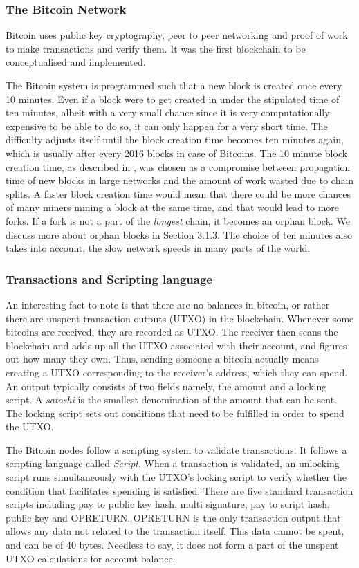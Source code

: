 \documentclass[english]{tktltiki}
\begin{document}
\subsubsection{The Bitcoin Network}

Bitcoin uses public key cryptography, peer to peer networking and proof of work to make transactions and verify them. It was the first blockchain to be conceptualised and implemented.

The Bitcoin system is programmed such that a new block is created once every 10 minutes. Even if a block were to get created in under the stipulated time of ten minutes, albeit with a very small chance since it is very computationally expensive to be able to do so, it can only  happen for a very short time. The difficulty adjusts itself until the block creation time becomes ten minutes again, which is usually after every 2016 blocks in case of Bitcoins. The 10 minute block creation time, as described in \cite{bitcoin}, was chosen as a compromise between propagation time of new blocks in large networks and the amount of work wasted due to chain splits. A faster block creation time would mean that there could be more chances of many miners mining a block at the same time, and that would lead to more forks. If a fork is not a part of the \textit{longest} chain, it becomes an orphan block. We discuss more about orphan blocks in Section 3.1.3. The choice of ten minutes also takes into account, the slow network speeds in many parts of the world.

\subsubsection{Transactions and Scripting language}

An interesting fact to note is that there are no balances in bitcoin, or rather there are unspent transaction outputs (UTXO) in the blockchain. Whenever some bitcoins are received, they are recorded as UTXO. The receiver then scans the blockchain and adds up all the UTXO associated with their account, and figures out how many they own. Thus, sending someone a bitcoin actually means creating a UTXO corresponding to the receiver's address, which they can spend. An output typically consists of two fields namely, the amount and a locking script. A \textit{satoshi} is the smallest denomination of the amount that can be sent. The locking script sets out conditions that need to be fulfilled in order to spend the UTXO.

The Bitcoin nodes follow a scripting system to validate transactions. It follows a scripting language called \textit{Script}. When a transaction is validated, an unlocking script runs simultaneously with the UTXO's locking script to verify whether the condition that facilitates spending is satisfied. There are five standard transaction scripts including pay to public key hash, multi signature, pay to script hash, public key and OP\textunderscore RETURN. OP\textunderscore RETURN is the only transaction output that allows any data not related to the transaction itself. This data cannot be spent, and can be of 40 bytes. Needless to say, it does not form a part of the unspent UTXO calculations for account balance.
\end{document}
